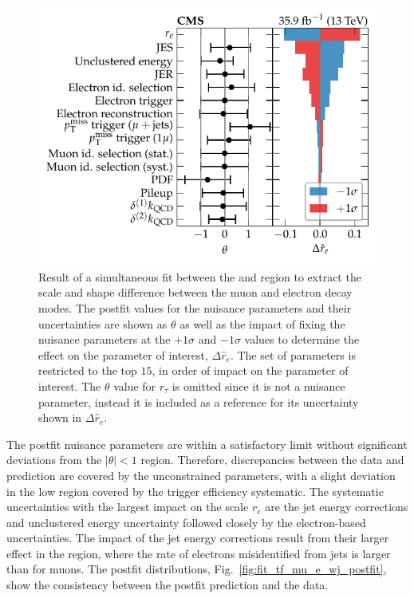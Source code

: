 \begin{figure}[htb]
    \centering
    \includegraphics{chapters/042_backgrounds/images/impacts_tfmu2ewj.pdf}
    \caption[Nuisance parameters from a simultaneous fit to the muon and electron control regions]{
        Result of a simultaneous fit between the \muplusjets and \eleplusjets region to extract the scale and shape difference between the muon and electron decay modes. The postfit values for the nuisance parameters and their uncertainties are shown as $\theta$ as well as the impact of fixing the nuisance parameters at the $+1\sigma$ and $-1\sigma$ values to determine the effect on the parameter of interest, $\Delta \hat{r}_e$. The set of parameters is restricted to the top $15$, in order of impact on the parameter of interest. The $\theta$ value for $r_\tau$ is omitted since it is not a nuisance parameter, instead it is included as a reference for its uncertainty shown in $\Delta \hat{r}_e$.
    }
    \label{fig:fit_tf_mu_e_wj_impacts}
\end{figure}
%
The postfit nuisance parameters are within a satisfactory limit without significant deviations from the $|\theta|<1$ region. Therefore, discrepancies between the data and prediction are covered by the unconstrained parameters, with a slight deviation in the low \recoil \muplusjets region covered by the \ptmiss trigger efficiency systematic. The systematic uncertainties with the largest impact on the scale $r_e$ are the jet energy corrections and unclustered energy uncertainty followed closely by the electron-based uncertainties. The impact of the jet energy corrections result from their larger effect in the \eleplusjets region, where the rate of electrons misidentified from jets is larger than for muons. The postfit distributions, Fig.~\ref{fig:fit_tf_mu_e_wj_postfit}, show the consistency between the postfit prediction and the data.
